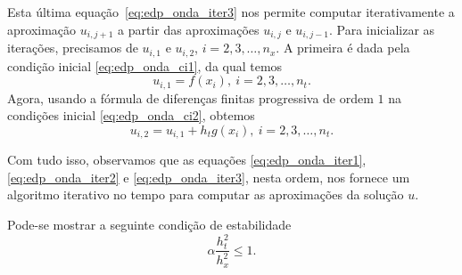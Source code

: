 Esta última equação~\eqref{eq:edp_onda_iter3} nos permite computar iterativamente a aproximação $u_{i,j+1}$ a partir das aproximações $u_{i,j}$ e $u_{i,j-1}$. Para inicializar as iterações, precisamos de $u_{i,1}$ e $u_{i,2}$, $i=2, 3, \dotsc, n_x$. A primeira é dada pela condição inicial \eqref{eq:edp_onda_ci1}, da qual temos
\begin{equation}\label{eq:edp_onda_iter1}
  u_{i,1} = f(x_i), ~i=2, 3, \dotsc, n_t.
\end{equation}
Agora, usando a fórmula de diferenças finitas progressiva de ordem $1$ na condições inicial \eqref{eq:edp_onda_ci2}, obtemos
\begin{equation}\label{eq:edp_onda_iter2}
  u_{i,2} = u_{i,1} + h_tg(x_i), ~i=2, 3, \dotsc, n_t.
\end{equation}

Com tudo isso, observamos que as equações \eqref{eq:edp_onda_iter1}, \eqref{eq:edp_onda_iter2} e \eqref{eq:edp_onda_iter3}, nesta ordem, nos fornece um algoritmo iterativo no tempo para computar as aproximações da solução $u$.

\begin{obs}
  Pode-se mostrar a seguinte condição de estabilidade
  \begin{equation}
    \alpha \frac{h_t^2}{h_x^2} \leq 1.
  \end{equation}
\end{obs}

